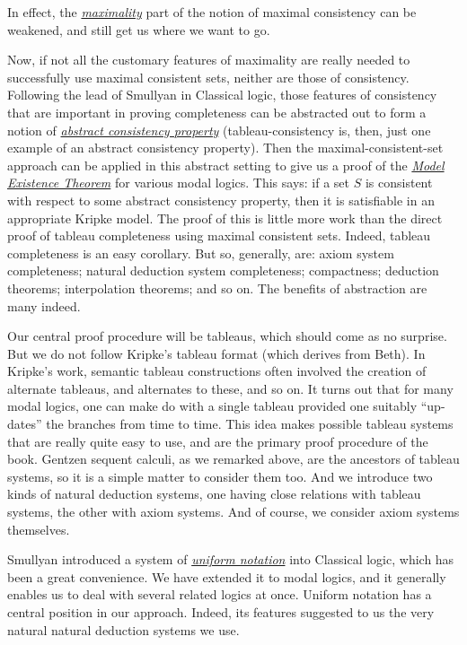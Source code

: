 In effect, 
the \underline{\textit{maximality}} part of the notion of maximal consistency can be weakened, 
and still get us where we want to go.



Now, 
if not all the customary features of maximality are really needed to successfully use maximal consistent sets, 
neither are those of consistency. 
% 
Following the lead of Smullyan in Classical logic, 
those features of consistency that are important in proving completeness can be abstracted out to form a notion of 
\underline{\textit{abstract consistency property}} 
(tableau-consistency is, then, just one example of an abstract consistency property).
% 
% 
Then the maximal-consistent-set approach can be applied in this abstract setting to give us a proof of the \underline{\textit{Model Existence Theorem}} for various modal logics.
% 
This says: 
if a set $S$ is consistent with respect to some abstract consistency property, then it is satisfiable in an appropriate Kripke model.
% 
% 
The proof of this is little more work than the direct proof of tableau completeness using maximal consistent sets.
% 
Indeed, 
tableau completeness is an easy
corollary.
% 
But so, 
generally, are: 
axiom system completeness; 
natural deduction system completeness;
compactness;
 deduction theorems; 
 interpolation theorems;
and so on. 
The benefits of abstraction are many indeed.



Our central proof procedure will be tableaus, 
which should come as no surprise. 
% 
But we do not follow Kripke's tableau format (which derives from Beth). 
% 
In Kripke's work, 
semantic tableau constructions often involved the creation of alternate tableaus, 
and alternates to these, and so on. 
% 
It turns out that for many modal logics, 
one can make do with a single tableau provided one suitably ``up-dates'' the branches from time to time.
% 
This idea makes possible tableau systems that are really quite easy to use,
and are the primary proof procedure of the book.
% 
% 
Gentzen sequent calculi, 
as we remarked above, 
are the ancestors of tableau systems, 
so it is a simple matter to consider them too.
% 
% 
And we introduce two kinds of natural deduction systems, 
one having close relations with tableau systems,
the other with axiom systems.
% 
And of course, 
we consider axiom systems themselves.




Smullyan introduced a system of \underline{\textit{uniform notation}} into Classical logic, 
which has been a great convenience.
% 
We have extended it to modal logics, 
and it generally enables us to deal with several related logics at once.
% 
Uniform notation has a central position in our approach.
% 
Indeed,
its features suggested to us the very natural natural deduction systems we use.




